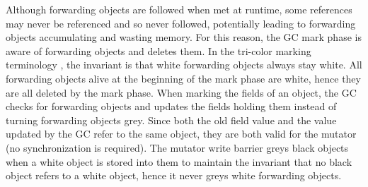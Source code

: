 \documentclass[sigplan,10pt,review,anonymous]{acmart}\settopmatter{printfolios=true,printccs=false,printacmref=false}
\def\OpenSmalltalkVM{OpenSmalltalk-VM\xspace}
\begin{document}
Although forwarding objects are followed when met at runtime, some references may never be referenced and so never followed, potentially leading to forwarding objects accumulating and wasting memory. For this reason, the GC mark phase is aware of forwarding objects and deletes them. In the tri-color marking terminology \cite{firstTriColorGC}, the invariant is that white forwarding objects always stay white. All forwarding objects alive at the beginning of the mark phase are white, hence they are all deleted by the mark phase. When marking the fields of an object, the GC checks for forwarding objects and updates the fields holding them instead of turning forwarding objects grey. Since both the old field value and the value updated by the GC refer to the same object, they are both valid for the mutator (no synchronization is required). The mutator write barrier greys black objects when a white object is stored into them to maintain the invariant that no black object refers to a white object, hence it never greys white forwarding objects.


\end{document}
